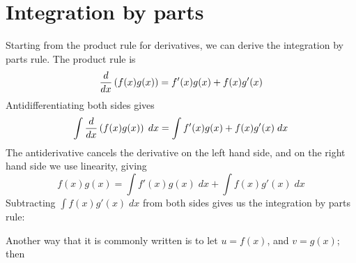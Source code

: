 \section{Integration by parts} \label{integration by parts}
Starting from the product rule for derivatives, we can derive the integration by parts rule. The product rule is
\[
\frac{d}{dx}\left(f(x)g(x)\right) = f'(x)g(x) + f(x)g'(x)
\]
%
%	
%	
Antidifferentiating both sides gives
\[
\int\frac{d}{dx}\left(f(x)g(x)\right) \; dx = \int f'(x)g(x) + f(x)g'(x) \; dx
\]
The antiderivative cancels the derivative on the left hand side, and on the right hand side we use linearity, giving
\[
f(x)g(x) = \int f'(x)g(x) \; dx + \int f(x)g'(x) \; dx
\]
Subtracting $ \int f(x)g'(x) \; dx$ from both sides gives us the integration by parts rule:

  	\bigskip
	
	\hfil{}
	\bigskip

\noindent Another way that it is commonly written is to let $u = f(x)$, and $v = g(x)$; then

  	\bigskip
	
	\hfil{}
	\bigskip


